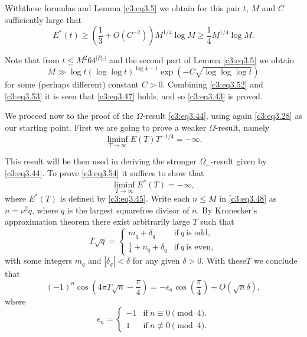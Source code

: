 With\pageoriginale these formulas and Lemma \eqref{c3:eq3.5} we obtain
for this pair $t$, $M$ and $C$ sufficiently large that
\begin{equation}
  E^* (t) \geq \left(\frac{1}{3} + O(C^{-2}) \right) M^{1/4} \log M
  \geq \frac{1}{4} M^{1/4} \log M.\label{c3:eq3.52}
\end{equation}

Note that from $t \leq M^2 64^{|P_C|}$ and the second part of Lemma
\eqref{c3:eq3.5} we obtain
\begin{equation}
  M \gg \log t (\log \log t)^{\log 4-1} \exp \left( -C\sqrt{\log \log
    \log t} \right)\label{c3:eq3.53}
\end{equation}
for some (perhaps different) constant $C > 0$. Combining
\eqref{c3:eq3.52} and \eqref{c3:eq3.53} it is seen that
\eqref{c3:eq3.47} holds, and so \eqref{c3:eq3.43} is proved.

We proceed now to the proof of the $\Omega$-result \eqref{c3:eq3.44},
using again \eqref{c3:eq3.28} as our starting point. First we are
going to prove a weaker $\Omega$-result, namely
\begin{equation}
  \liminf_{T \to \infty} E(T) T^{-1/4} = -
  \infty.\label{c3:eq3.54} 
\end{equation}

This result will be then used in deriving the stronger
$\Omega_-$-result given by \eqref{c3:eq3.44}. To prove
\eqref{c3:eq3.54} it suffices to show that 
\begin{equation}
  \liminf_{T \to \infty} E^*(T)  = -
  \infty,\label{c3:eq3.55}   
\end{equation}
where $E^* (T)$ is defined by \eqref{c3:eq3.45}. Write each $n \leq M$
in \eqref{c3:eq3.48} as $n= \nu^2 q$, where $q$ is the largest
squarefree divisor of $n$. By Kronecker's approximation theorem there
exist arbitrarily large $T$ such that
$$
T\sqrt{q} = 
\begin{cases}
  m_q + \delta_q & \text{if}~ q ~\text{is odd},\\
  \frac{1}{4} + n_q + \delta_q & \text{if}~ q ~\text{is even},
\end{cases}
$$
with some integers $m_q$ and $|\delta_q|< \delta$ for any given
$\delta> 0$. With these\pageoriginale $T$ we conclude that
$$
(-1)^n \cos \left(4 \pi T \sqrt{n} - \frac{\pi}{4}\right) =
-\epsilon_n  \cos \left( \frac{\pi}{4}\right) + O(\sqrt{n} \delta),
$$
where
$$
\epsilon_n = 
\begin{cases}
  -1 & \text{if}~ n \equiv 0 \pmod{4}.\\
  1 & \text{if}~ n \nequiv 0 \pmod{4}.
\end{cases}
$$

